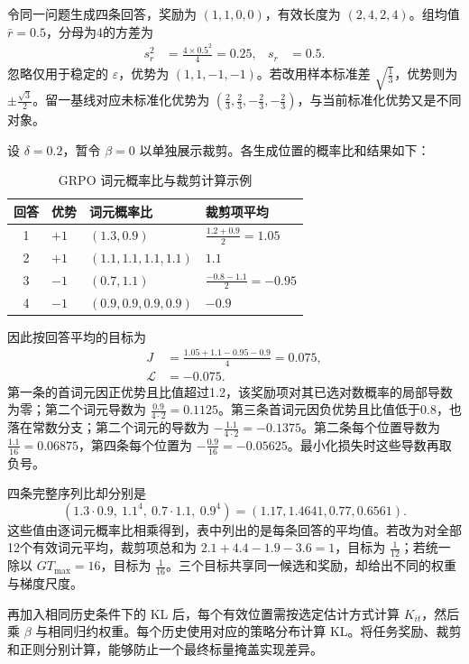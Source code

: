 \documentclass[../textbook.tex]{subfiles}
\begin{document}
\begin{example}


令同一问题生成四条回答，奖励为 $(1,1,0,0)$，有效长度为 $(2,4,2,4)$。组均值 $\bar r=0.5$，分母为4的方差为
\begin{align*}
 s_r^2 &= \frac{4\times0.5^2}{4}=0.25, & s_r &= 0.5.
\end{align*}
忽略仅用于稳定的 $\varepsilon$，优势为 $(1,1,-1,-1)$。若改用样本标准差 $\sqrt{\frac{1}{3}}$，优势则为 $\pm\frac{\sqrt3}{2}$。留一基线对应未标准化优势为 $(\frac{2}{3},\frac{2}{3},-\frac{2}{3},-\frac{2}{3})$，与当前标准化优势又是不同对象。

设 $\delta=0.2$，暂令 $\beta=0$ 以单独展示裁剪。各生成位置的概率比和结果如下：
\begin{table}[htbp]
\centering
\caption{GRPO 词元概率比与裁剪计算示例}
\label{tab:grpo-clipping-example}
\begin{tabularx}{\linewidth}{clXl}
\toprule 回答 & 优势 & 词元概率比 & 裁剪项平均\\\midrule
1 & $+1$ & $(1.3,0.9)$ & $\frac{1.2+0.9}{2}=1.05$\\
2 & $+1$ & $(1.1,1.1,1.1,1.1)$ & $1.1$\\
3 & $-1$ & $(0.7,1.1)$ & $\frac{-0.8-1.1}{2}=-0.95$\\
4 & $-1$ & $(0.9,0.9,0.9,0.9)$ & $-0.9$\\
\bottomrule
\end{tabularx}
\end{table}
因此按回答平均的目标为
\begin{align*}
 J &= \frac{1.05+1.1-0.95-0.9}{4}=0.075, \\
 \mathcal L &= -0.075.
\end{align*}
第一条的首词元因正优势且比值超过1.2，该奖励项对其已选对数概率的局部导数为零；第二个词元导数为 $\frac{0.9}{4\cdot2}=0.1125$。第三条首词元因负优势且比值低于0.8，也落在常数分支；第二个词元的导数为 $-\frac{1.1}{4\cdot2}=-0.1375$。第二条每个位置导数为 $\frac{1.1}{16}=0.06875$，第四条每个位置为 $-\frac{0.9}{16}=-0.05625$。最小化损失时这些导数再取负号。

四条完整序列比却分别是
\begin{equation*}
 (1.3\cdot0.9,\ 1.1^4,\ 0.7\cdot1.1,\ 0.9^4)
 =(1.17,1.4641,0.77,0.6561).
\end{equation*}
这些值由逐词元概率比相乘得到，表中列出的是每条回答的平均值。若改为对全部12个有效词元平均，裁剪项总和为 $2.1+4.4-1.9-3.6=1$，目标为 $\frac{1}{12}$；若统一除以 $G T_{\max}=16$，目标为 $\frac{1}{16}$。三个目标共享同一候选和奖励，却给出不同的权重与梯度尺度。

再加入相同历史条件下的 KL 后，每个有效位置需按选定估计方式计算 $K_{it}$，然后乘 $\beta$ 与相同归约权重。每个历史使用对应的策略分布计算 KL。将任务奖励、裁剪和正则分别计算，能够防止一个最终标量掩盖实现差异。
\end{example}
\end{document}
